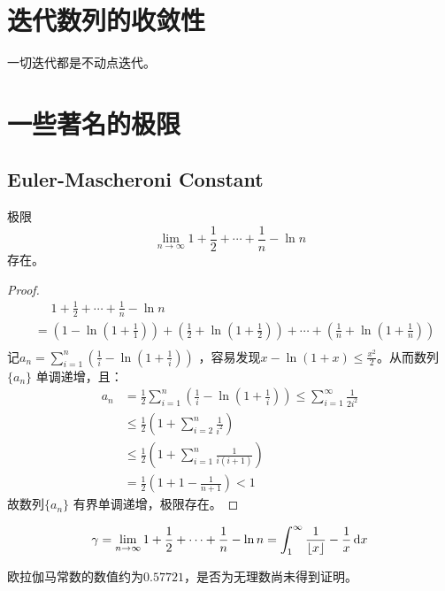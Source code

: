 \section{迭代数列的收敛性}
一切迭代都是不动点迭代。

\section{一些著名的极限}

\subsection{Euler-Mascheroni Constant}

\begin{theorem}[Euler常数的存在性]
    极限\[
        \lim_{n \to \infty} 1 + \frac{1}{2} + \cdots +
        \frac{1}{n} - \ln n
    \]
    存在。
\end{theorem}

\begin{proof}
    \begin{align*}
        &\phantom{=} 1 + \frac{1}{2} + \cdots +
        \frac{1}{n} - \ln n \\
        & = \left( 1 - \ln \left( 1+ \frac{1}{1} \right) \right) +
        \left( \frac{1}{2} + \ln \left( 1+\frac{1}{2}  \right)
        \right) + \cdots + \left( \frac{1}{n} + \ln \left( 1 +
        \frac{1}{n} \right) \right)
        \\
    \end{align*}
    记\(a_{n} = \sum_{i=1}^{n} \left( \frac{1}{i} - \ln \left( 1 +
    \frac{1}{i} \right) \right) \) ，容易发现\(x-\ln(1+x) \leq
    \frac{x^2}{2}\)。从而数列\(\{a_{n}\}\) 单调递增，且：
    \begin{align*}
        a_{n} &= \frac{1}{2} \sum_{i=1}^{n} \left( \frac{1}{i} -
            \ln \left( 1 +
        \frac{1}{i} \right) \right) \leq \sum_{i=1}^{\infty}
        \frac{1}{2i^2} \\
        &\leq \frac{1}{2} \left( 1 + \sum_{i=2}^{n}
        \frac{1}{i^{2}} \right) \\
        &\leq \frac{1}{2} \left( 1 + \sum_{i=1}^{n}
        \frac{1}{i(i+1)}\right) \\
        &= \frac{1}{2} (1+1-\frac{1}{n+1}) <1
    \end{align*}
    故数列\(\{a_{n}\}\) 有界单调递增，极限存在。
\end{proof}

\begin{definition}
    \[
        \gamma = \lim_{n \to \infty} 1 + \frac{1}{2} + \cdots +
        \frac{1}{n} - \ln n = \int_{1}^{\infty} \frac{1}{\lfloor x
        \rfloor} - \frac{1}{x} \d{x}
    \]
\end{definition}

欧拉伽马常数的数值约为\(0.57721\)，是否为无理数尚未得到证明。
